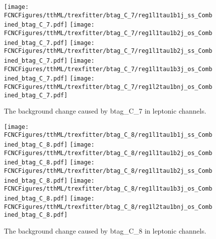 \begin{figure}[H]
\centering
\texttt{[image: \\FCNCFigures/tthML/trexfitter/btag\_C\_7/reg1l1tau1b1j\_ss\_Combined\_btag\_C\_7.pdf]}
\texttt{[image: \\FCNCFigures/tthML/trexfitter/btag\_C\_7/reg1l1tau1b2j\_os\_Combined\_btag\_C\_7.pdf]}
\texttt{[image: \\FCNCFigures/tthML/trexfitter/btag\_C\_7/reg1l1tau1b2j\_ss\_Combined\_btag\_C\_7.pdf]}
\texttt{[image: \\FCNCFigures/tthML/trexfitter/btag\_C\_7/reg1l1tau1b3j\_os\_Combined\_btag\_C\_7.pdf]}
\texttt{[image: \\FCNCFigures/tthML/trexfitter/btag\_C\_7/reg1l2tau1bnj\_os\_Combined\_btag\_C\_7.pdf]}
\caption{The background change caused by btag\_C\_7 in leptonic channels.}
\label{fig:tthML_btag_C_7}
\end{figure}

\begin{figure}[H]
\centering
\texttt{[image: \\FCNCFigures/tthML/trexfitter/btag\_C\_8/reg1l1tau1b1j\_ss\_Combined\_btag\_C\_8.pdf]}
\texttt{[image: \\FCNCFigures/tthML/trexfitter/btag\_C\_8/reg1l1tau1b2j\_os\_Combined\_btag\_C\_8.pdf]}
\texttt{[image: \\FCNCFigures/tthML/trexfitter/btag\_C\_8/reg1l1tau1b2j\_ss\_Combined\_btag\_C\_8.pdf]}
\texttt{[image: \\FCNCFigures/tthML/trexfitter/btag\_C\_8/reg1l1tau1b3j\_os\_Combined\_btag\_C\_8.pdf]}
\texttt{[image: \\FCNCFigures/tthML/trexfitter/btag\_C\_8/reg1l2tau1bnj\_os\_Combined\_btag\_C\_8.pdf]}
\caption{The background change caused by btag\_C\_8 in leptonic channels.}
\label{fig:tthML_btag_C_8}
\end{figure}



